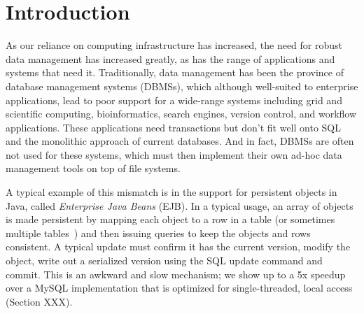 \documentclass[letterpaper,twocolumn,10pt]{article}
\begin{document}





\section{Introduction}

As our reliance on computing infrastructure has increased, the need
for robust data management has increased greatly, as has the range of
applications and systems that need it.  Traditionally, data management
has been the province of database management systems (DBMSs), which although
well-suited to enterprise applications, lead to poor support for a
wide-range systems including grid and scientific computing,
bioinformatics, search engines, version control, and workflow
applications.  These applications need transactions but don't fit well
onto SQL and the monolithic approach of current databases.  And in
fact, DBMSs are often not used for these systems, which must then
implement their own ad-hoc data management tools on top of file
systems.

A typical example of this mismatch is in the support for
persistent objects in Java, called {\em Enterprise Java Beans}
(EJB). In a typical usage, an array of objects is made persistent by
mapping each object to a row in a table (or sometimes multiple
tables~\cite{xxx}) and then issuing queries to keep the objects and
rows consistent. A typical update must confirm it has the current
version, modify the object, write out a serialized version using the
SQL update command and commit. This is an awkward and slow mechanism;
we show up to a 5x speedup over a MySQL implementation that is
optimized for single-threaded, local access (Section XXX).
\end{document}
